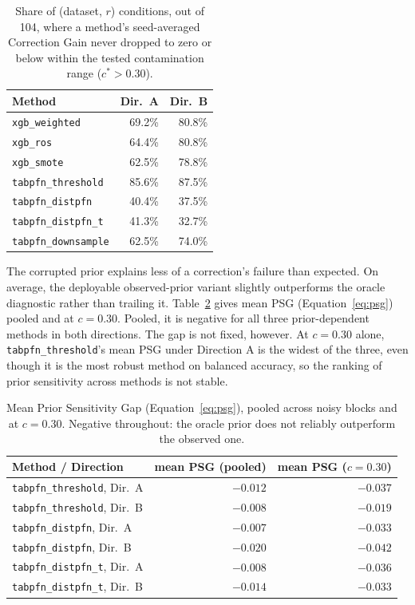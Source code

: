 \begin{table}[t]
\centering
\caption{Share of (dataset, $r$) conditions, out of 104, where a method's
seed-averaged Correction Gain never dropped to zero or below within the tested
contamination range ($c^*>0.30$).}
\label{tab:breakeven}
\begin{tabular}{@{}lrr@{}}
\toprule
Method & Dir.\ A & Dir.\ B \\
\midrule
\texttt{xgb\_weighted}      & 69.2\% & 80.8\% \\
\texttt{xgb\_ros}           & 64.4\% & 80.8\% \\
\texttt{xgb\_smote}         & 62.5\% & 78.8\% \\
\texttt{tabpfn\_threshold}  & 85.6\% & 87.5\% \\
\texttt{tabpfn\_distpfn}    & 40.4\% & 37.5\% \\
\texttt{tabpfn\_distpfn\_t} & 41.3\% & 32.7\% \\
\texttt{tabpfn\_downsample} & 62.5\% & 74.0\% \\
\bottomrule
\end{tabular}
\end{table}

The corrupted prior explains less of a correction's failure than expected. On
average, the deployable observed-prior variant slightly outperforms the oracle
diagnostic rather than trailing it. Table~\ref{tab:psg} gives mean PSG
(Equation~\ref{eq:psg}) pooled and at $c{=}0.30$. Pooled, it is negative for all
three prior-dependent methods in both directions. The gap is not fixed, however.
At $c{=}0.30$ alone, \texttt{tabpfn\_threshold}'s mean PSG under Direction A is the
widest of the three, even though it is the most robust method on balanced
accuracy, so the ranking of prior sensitivity across methods is not stable.

\begin{table}[t]
\centering
\caption{Mean Prior Sensitivity Gap (Equation~\ref{eq:psg}), pooled across noisy
blocks and at $c{=}0.30$. Negative throughout: the oracle prior does not reliably
outperform the observed one.}
\label{tab:psg}
\begin{tabular}{@{}lrr@{}}
\toprule
Method / Direction & mean PSG (pooled) & mean PSG ($c{=}0.30$) \\
\midrule
\texttt{tabpfn\_threshold}, Dir.\ A  & $-0.012$ & $-0.037$ \\
\texttt{tabpfn\_threshold}, Dir.\ B  & $-0.008$ & $-0.019$ \\
\texttt{tabpfn\_distpfn}, Dir.\ A    & $-0.007$ & $-0.033$ \\
\texttt{tabpfn\_distpfn}, Dir.\ B    & $-0.020$ & $-0.042$ \\
\texttt{tabpfn\_distpfn\_t}, Dir.\ A & $-0.008$ & $-0.036$ \\
\texttt{tabpfn\_distpfn\_t}, Dir.\ B & $-0.014$ & $-0.033$ \\
\bottomrule
\end{tabular}
\end{table}

